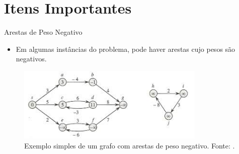 \documentclass[aspectratio=169]{beamer}
\begin{document}
\section{Itens Importantes}
	\begin{frame}{Arestas de Peso Negativo}
		\begin{itemize}
			\item Em algumas instâncias do problema, pode haver arestas cujo pesos são negativos. 
		\end{itemize}
		
			\begin{figure}[H]
				\centering
				\includegraphics[width=0.8\textwidth]{img/negativo2.jpeg}
				\caption{Exemplo simples de um grafo com arestas de peso negativo. Fonte: \cite{cormen2002algoritmos}.}
				\label{fig:negativo1}
			\end{figure}
	\end{frame}
	
\end{document}
